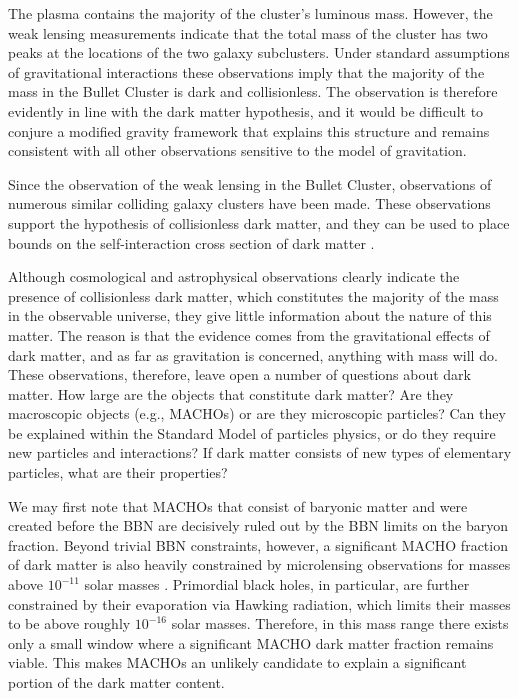 The plasma contains the majority of the cluster's luminous mass. However, the weak lensing measurements indicate that the total mass of the cluster has two peaks at the locations of the two galaxy subclusters. Under standard assumptions of gravitational interactions these observations imply that the majority of the mass in the Bullet Cluster is dark and collisionless. The observation is therefore evidently in line with the dark matter hypothesis, and it would be difficult to conjure a modified gravity framework that explains this structure and remains consistent with all other observations sensitive to the model of gravitation.

Since the observation of the weak lensing in the Bullet Cluster, observations of numerous similar colliding galaxy clusters have been made. These observations support the hypothesis of collisionless dark matter, and they can be used to place bounds on the self-interaction cross section of dark matter \parencite{HarveyEtAl2015}.

Although cosmological and astrophysical observations clearly indicate the presence of collisionless dark matter, which constitutes the majority of the mass in the observable universe, they give little information about the nature of this matter. The reason is that the evidence comes from the gravitational effects of dark matter, and as far as gravitation is concerned, anything with mass will do. These observations, therefore, leave open a number of questions about dark matter. How large are the objects that constitute dark matter? Are they macroscopic objects (e.g., MACHOs) or are they microscopic particles? Can they be explained within the Standard Model of particles physics, or do they require new particles and interactions? If dark matter consists of new types of elementary particles, what are their properties?

We may first note that MACHOs that consist of baryonic matter and were created before the BBN are decisively ruled out by the BBN limits on the baryon fraction. Beyond trivial BBN constraints, however, a significant MACHO fraction of dark matter is also heavily constrained by microlensing observations for masses above $10^{-11}$ solar masses \parencite{BirdEtAl2023}. Primordial black holes, in particular, are further constrained by their evaporation via Hawking radiation, which limits their masses to be above roughly $10^{-16}$ solar masses. Therefore, in this mass range there exists only a small window where a significant MACHO dark matter fraction remains viable. This makes MACHOs an unlikely candidate to explain a significant portion of the dark matter content.

